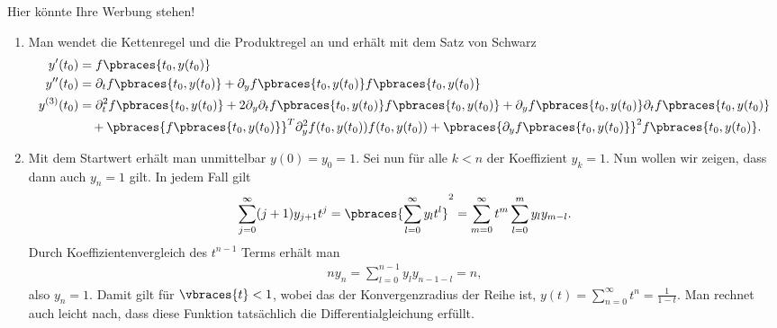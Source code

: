 \begin{solution}
    Hier könnte Ihre Werbung stehen!
    \begin{enumerate}[label = \alph*)]
        \item Man wendet die Kettenregel und die Produktregel an und erhält mit dem Satz von Schwarz
        \begin{align*}
            y^\prime(t_0) &= f\pbraces{t_0, y(t_0)} \\
            y^{\prime\prime}(t_0) &= \partial_t f\pbraces{t_0, y(t_0)} + \partial_y f\pbraces{t_0, y(t_0)} f\pbraces{t_0, y(t_0)} \\
            y^{(3)}(t_0) &= \partial_t^2 f\pbraces{t_0, y(t_0)} + 2 \partial_y \partial_t f\pbraces{t_0,y(t_0)} f\pbraces{t_0, y(t_0)} + \partial_y f\pbraces{t_0, y(t_0)} \partial_t f\pbraces{t_0,y(t_0)} \\
            & \quad + \pbraces{f\pbraces{t_0, y(t_0)}}^T \partial_y^2 f(t_0, y(t_0)) f(t_0, y(t_0)) + \pbraces{\partial_y f\pbraces{t_0, y(t_0)}}^2 f\pbraces{t_0, y(t_0)} .
        \end{align*}

        \item Mit dem Startwert erhält man unmittelbar $y(0) = y_0 = 1$. Sei nun für alle $k < n$ der Koeffizient $y_k = 1$. Nun wollen wir zeigen, dass dann auch $y_n = 1$ gilt. In jedem Fall gilt
        \begin{align*}
            \sum_{j = 0}^\infty (j+1) y_{j + 1} t^j = \pbraces{\sum_{l = 0}^\infty y_l t^l}^2 = \sum_{m = 0}^\infty t^m \sum_{l = 0}^m y_l y_{m-l} .
        \end{align*}
        Durch Koeffizientenvergleich des $t^{n-1}$ Terms erhält man
        \begin{align*}
            n y_n = \sum_{l = 0}^{n - 1} y_l y_{n - 1 -l} = n ,
        \end{align*}
        also $y_n = 1$. Damit gilt für $\vbraces{t} < 1$, wobei das der Konvergenzradius der Reihe ist, $y(t) = \sum_{n = 0}^\infty t^n = \frac{1}{1 - t}$. Man rechnet auch leicht nach, dass diese Funktion tatsächlich die Differentialgleichung erfüllt.
    \end{enumerate}
\end{solution}
